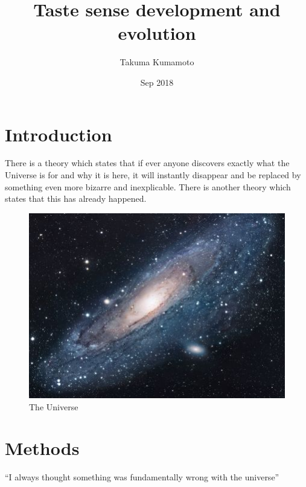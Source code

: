 \documentclass{article}
\title{Taste sense development and evolution}
\author{Takuma Kumamoto}
\date{Sep 2018}
\begin{document}
\maketitle

\section{Introduction}
There is a theory which states that if ever anyone discovers exactly what the Universe is for and why it is here, it will instantly disappear and be replaced by something even more bizarre and inexplicable.
There is another theory which states that this has already happened.

\begin{figure}[h!]
\centering
\includegraphics[scale=1.7]{universe}
\caption{The Universe}
\label{fig:universe}
\end{figure}

\section{Methods}
``I always thought something was fundamentally wrong with the universe'' \citep{adams1995hitchhiker}



\end{document}
